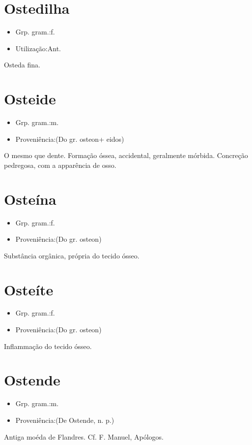 \section{Ostedilha}
\begin{itemize}
\item {Grp. gram.:f.}
\end{itemize}
\begin{itemize}
\item {Utilização:Ant.}
\end{itemize}
Osteda fina.
\section{Osteide}
\begin{itemize}
\item {Grp. gram.:m.}
\end{itemize}
\begin{itemize}
\item {Proveniência:(Do gr. \textunderscore osteon\textunderscore  + \textunderscore eidos\textunderscore )}
\end{itemize}
O mesmo que \textunderscore dente\textunderscore .
Formação óssea, accidental, geralmente mórbida.
Concreção pedregosa, com a apparência de osso.
\section{Osteína}
\begin{itemize}
\item {Grp. gram.:f.}
\end{itemize}
\begin{itemize}
\item {Proveniência:(Do gr. \textunderscore osteon\textunderscore )}
\end{itemize}
Substância orgânica, própria do tecido ósseo.
\section{Osteíte}
\begin{itemize}
\item {Grp. gram.:f.}
\end{itemize}
\begin{itemize}
\item {Proveniência:(Do gr. \textunderscore osteon\textunderscore )}
\end{itemize}
Inflammação do tecido ósseo.
\section{Ostende}
\begin{itemize}
\item {Grp. gram.:m.}
\end{itemize}
\begin{itemize}
\item {Proveniência:(De \textunderscore Ostende\textunderscore , n. p.)}
\end{itemize}
Antiga moéda de Flandres. Cf. F. Manuel, \textunderscore Apólogos\textunderscore .
